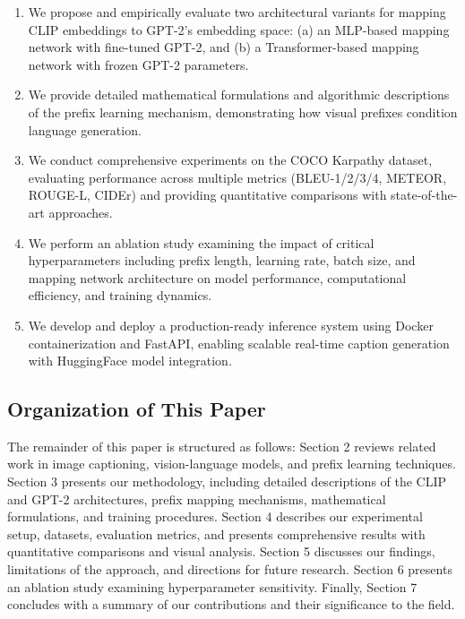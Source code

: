 \documentclass[runningheads]{llncs}
\begin{document}
\begin{enumerate}
\item We propose and empirically evaluate two architectural variants for mapping CLIP embeddings to GPT-2's embedding space: (a) an MLP-based mapping network with fine-tuned GPT-2, and (b) a Transformer-based mapping network with frozen GPT-2 parameters.

\item We provide detailed mathematical formulations and algorithmic descriptions of the prefix learning mechanism, demonstrating how visual prefixes condition language generation.

\item We conduct comprehensive experiments on the COCO Karpathy dataset, evaluating performance across multiple metrics (BLEU-1/2/3/4, METEOR, ROUGE-L, CIDEr) and providing quantitative comparisons with state-of-the-art approaches.

\item We perform an ablation study examining the impact of critical hyperparameters including prefix length, learning rate, batch size, and mapping network architecture on model performance, computational efficiency, and training dynamics.

\item We develop and deploy a production-ready inference system using Docker containerization and FastAPI, enabling scalable real-time caption generation with HuggingFace model integration.
\end{enumerate}

\subsection{Organization of This Paper}

The remainder of this paper is structured as follows: Section 2 reviews related work in image captioning, vision-language models, and prefix learning techniques. Section 3 presents our methodology, including detailed descriptions of the CLIP and GPT-2 architectures, prefix mapping mechanisms, mathematical formulations, and training procedures. Section 4 describes our experimental setup, datasets, evaluation metrics, and presents comprehensive results with quantitative comparisons and visual analysis. Section 5 discusses our findings, limitations of the approach, and directions for future research. Section 6 presents an ablation study examining hyperparameter sensitivity. Finally, Section 7 concludes with a summary of our contributions and their significance to the field.
\end{document}
